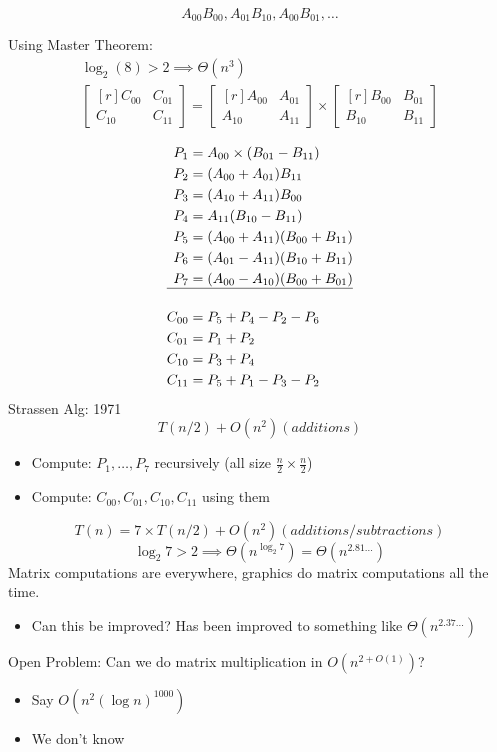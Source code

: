 \documentclass[11pt]{article}
\begin{document}
\begin{equation*}
A_{00}B_{00},A_{01}B_{10},A_{00}B_{01}, \ldots
\end{equation*}

Using Master Theorem:
\begin{align*}
\log_2(8)>2 \implies \Theta(n^3)
\\
\begin{bmatrix*}[r] 
C_{00} & C_{01} \\ C_{10} & C_{11} 
\end{bmatrix*} 
= 
\begin{bmatrix*}[r]
A_{00} & A_{01} \\ A_{10} & A_{11} 
\end{bmatrix*} 
\times 
\begin{bmatrix*}[r]
B_{00} & B_{01} \\ B_{10} & B_{11}
\end{bmatrix*}
\end{align*}

\begin{align*}
P_1 & = A_{00}\times (B_{01}-B_{11})
\\ P_2 & = (A_{00}+A_{01})B_{11}
\\ P_3 & = (A_{10}+A_{11})B_{00}
\\ P_4 & = A_{11}(B_{10}-B_{11})
\\P_5 & = (A_{00}+A_{11})(B_{00}+B_{11})
\\P_6 & = (A_{01}-A_{11})(B_{10}+B_{11})
\\ P_7 & = (A_{00}-A_{10})(B_{00}+B_{01})
\\ \hline
\\ C_{00} & = P_5+P_4-P_2-P_6
\\ C_{01} & = P_1+P_2
\\ C_{10} & = P_3+P_4
\\ C_{11} & = P_5+P_1-P_3-P_2
\end{align*}
Strassen Alg: 1971
$$ T(n/2)+O(n^2) (additions)$$
\begin{itemize}
\item Compute: \(P_1,\ldots,P_7\) recursively (all size \(\frac{n}{2}\times \frac{n}{2}\))
\item Compute: \(C_{00}, C_{01},C_{10},C_{11}\) using them
\end{itemize}
$$T(n)=7 \times T(n/2)+O(n^2)(additions/subtractions)$$
$$\log_2 7 > 2 \implies \Theta (n^{\log_2 7})=\Theta(n^{2.81\ldots})$$
Matrix computations are everywhere, graphics do matrix computations all the time. 
\begin{itemize}
\item Can this be improved? Has been improved to something like \(\Theta(n^{2.37\ldots})\)
\end{itemize}
Open Problem: Can we do matrix multiplication in \(O(n^{2+O(1)})\)?
\begin{itemize}
\item Say \(O(n^2(\log n)^{1000})\)
\item We don't know
\end{itemize}
\end{document}
